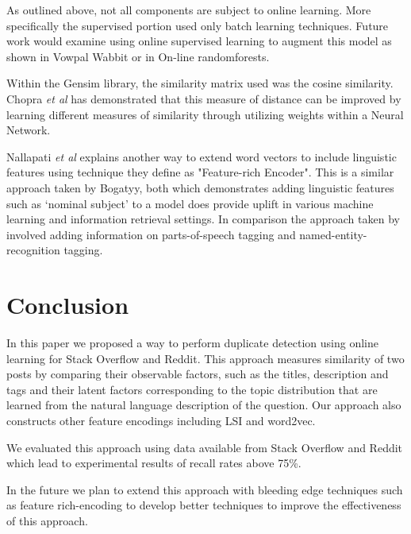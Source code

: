 \documentclass[journal]{IEEEtran}
\begin{document}
As outlined above, not all components are subject to online learning. More specifically the supervised portion used only batch learning techniques. Future work would examine using online supervised learning to augment this model as shown in Vowpal Wabbit\cite{vowpalwabbit} or in On-line randomforests\cite{onlinerf}.

Within the Gensim library, the similarity matrix used was the cosine similarity. Chopra \emph{et al}\cite{simmatrix} has demonstrated that this measure of distance can be improved by learning different measures of similarity through utilizing weights within a Neural Network. 


Nallapati \emph{et al}\cite{featurerich} explains another way to extend word vectors to include linguistic features using technique they define as "Feature-rich Encoder". This is a similar approach taken by Bogatyy\cite{bog}, both which demonstrates adding linguistic features such as `nominal subject' to a model does provide uplift in various machine learning and information retrieval settings. In comparison the approach taken by \cite{featurerich} involved adding information on parts-of-speech tagging and named-entity-recognition tagging. 


\section{Conclusion}

In this paper we proposed a way to perform duplicate detection using online learning for Stack Overflow and Reddit. This approach measures similarity of two posts by comparing their observable factors, such as the titles, description and tags and their latent factors corresponding to the topic distribution that are learned from the natural language description of the question. Our approach also constructs other feature encodings including LSI and word2vec. 

We evaluated this approach using data available from Stack Overflow and Reddit which lead to experimental results of recall rates above 75\%.

In the future we plan to extend this approach with bleeding edge techniques such as feature rich-encoding to develop better techniques to improve the effectiveness of this approach.
\end{document}
